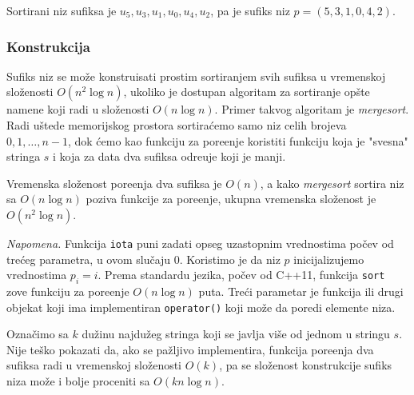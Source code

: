 Sortirani niz sufiksa je $u_5, u_3, u_1, u_0, u_4, u_2$, pa je sufiks niz $p = (5,3,1,0,4,2)$.

\subsubsection{Konstrukcija}

Sufiks niz se mo\v ze konstruisati prostim sortiranjem svih sufiksa u vremenskoj slo\v zenosti $O(n^2 \log n)$, ukoliko je dostupan algoritam za sortiranje op\v ste namene koji radi u slo\v zenosti $O(n \log n)$. Primer takvog algoritam je \textit{mergesort}. Radi u\v stede memorijskog prostora sortira\' cemo samo niz celih brojeva $0,1,\ldots,n-1$, dok \' cemo kao funkciju za pore\dj enje koristiti funkciju koja je "svesna" stringa $s$ i koja za data dva sufiksa odre\dj uje koji je manji.

\noindent
\begin{minipage}[l]{\textwidth}

\end{minipage}

Vremenska slo\v zenost pore\dj enja dva sufiksa je $O(n)$, a kako \textit{mergesort} sortira niz sa $O(n \log n)$ poziva funkcije za pore\dj enje, ukupna vremenska slo\v zenost je $O(n^2 \log n)$.

\noindent
\begin{minipage}[l]{\textwidth}

\end{minipage}

\textit{Napomena.} Funkcija \texttt{iota} puni zadati opseg uzastopnim vrednostima po\v cev od tre\' ceg parametra, u ovom slu\v caju $0$. Koristimo je da niz $p$ inicijalizujemo vrednostima $p_i = i$. Prema standardu jezika, po\v cev od C++11, funkcija \texttt{sort} zove funkciju za pore\dj enje $O(n \log n)$ puta. \cite{sortnlogn} Tre\' ci parametar je funkcija ili drugi objekat koji ima implementiran \texttt{operator()} koji mo\v ze da poredi elemente niza.

Ozna\v cimo sa $k$ du\v zinu najdu\v zeg stringa koji se javlja vi\v se od jednom u stringu $s$. Nije te\v sko pokazati da, ako se pa\v zljivo implementira, funkcija pore\dj enja dva sufiksa radi u vremenskoj slo\v zenosti $O(k)$, pa se slo\v zenost konstrukcije sufiks niza mo\v ze i bolje proceniti sa $O(kn \log n)$.

